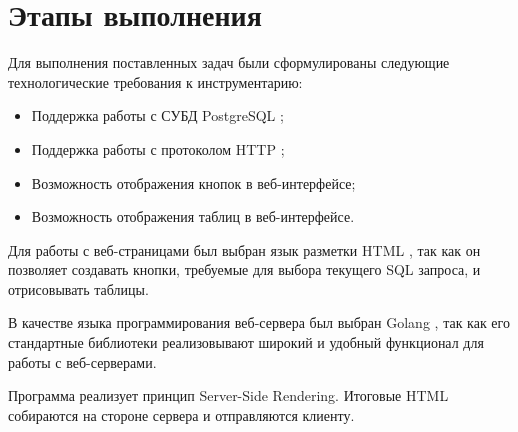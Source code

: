 \chapter{Этапы выполнения}

Для выполнения поставленных задач были сформулированы следующие технологические требования к инструментарию:
\begin{itemize}
    \item Поддержка работы с СУБД PostgreSQL \cite{doc:postgres};
    \item Поддержка работы с протоколом HTTP \cite{wiki:http};
    \item Возможность отображения кнопок в веб-интерфейсе;
    \item Возможность отображения таблиц в веб-интерфейсе.
\end{itemize}

Для работы с веб-страницами был выбран язык разметки HTML \cite{wiki:html}, так как он позволяет создавать кнопки, требуемые
для выбора текущего SQL запроса, и отрисовывать таблицы.

В качестве языка программирования веб-сервера был выбран Golang \cite{wiki:go}, так как его стандартные библиотеки реализовывают широкий
и удобный функционал для работы с веб-серверами.

Программа реализует принцип Server-Side Rendering.
Итоговые HTML собираются на стороне сервера и отправляются клиенту.
